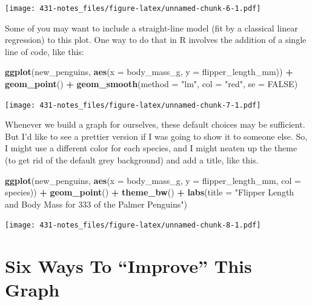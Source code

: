 \documentclass[
]{book}
\newenvironment{Shaded}{\begin{snugshade}}{\end{snugshade}}
\newcommand{\DataTypeTok}[1]{\textcolor[rgb]{0.13,0.29,0.53}{#1}}
\newcommand{\KeywordTok}[1]{\textcolor[rgb]{0.13,0.29,0.53}{\textbf{#1}}}
\newcommand{\NormalTok}[1]{#1}
\newcommand{\OperatorTok}[1]{\textcolor[rgb]{0.81,0.36,0.00}{\textbf{#1}}}
\newcommand{\OtherTok}[1]{\textcolor[rgb]{0.56,0.35,0.01}{#1}}
\newcommand{\StringTok}[1]{\textcolor[rgb]{0.31,0.60,0.02}{#1}}
\begin{document}
\texttt{[image: 431-notes\_files/figure-latex/unnamed-chunk-6-1.pdf]}

Some of you may want to include a straight-line model (fit by a classical linear regression) to this plot. One way to do that in R involves the addition of a single line of code, like this:

\begin{Shaded}
\begin{Highlighting}[]
\KeywordTok{ggplot}\NormalTok{(new_penguins, }\KeywordTok{aes}\NormalTok{(}\DataTypeTok{x =}\NormalTok{ body_mass_g, }\DataTypeTok{y =}\NormalTok{ flipper_length_mm)) }\OperatorTok{+}
\StringTok{    }\KeywordTok{geom_point}\NormalTok{() }\OperatorTok{+}
\StringTok{    }\KeywordTok{geom_smooth}\NormalTok{(}\DataTypeTok{method =} \StringTok{"lm"}\NormalTok{, }\DataTypeTok{col =} \StringTok{"red"}\NormalTok{, }\DataTypeTok{se =} \OtherTok{FALSE}\NormalTok{)}
\end{Highlighting}
\end{Shaded}

\texttt{[image: 431-notes\_files/figure-latex/unnamed-chunk-7-1.pdf]}

Whenever we build a graph for ourselves, these default choices may be sufficient. But I'd like to see a prettier version if I was going to show it to someone else. So, I might use a different color for each species, and I might neaten up the theme (to get rid of the default grey background) and add a title, like this.

\begin{Shaded}
\begin{Highlighting}[]
\KeywordTok{ggplot}\NormalTok{(new_penguins, }\KeywordTok{aes}\NormalTok{(}\DataTypeTok{x =}\NormalTok{ body_mass_g, }\DataTypeTok{y =}\NormalTok{ flipper_length_mm, }\DataTypeTok{col =}\NormalTok{ species)) }\OperatorTok{+}
\StringTok{    }\KeywordTok{geom_point}\NormalTok{() }\OperatorTok{+}\StringTok{ }
\StringTok{    }\KeywordTok{theme_bw}\NormalTok{() }\OperatorTok{+}\StringTok{ }
\StringTok{    }\KeywordTok{labs}\NormalTok{(}\DataTypeTok{title =} \StringTok{"Flipper Length and Body Mass for 333 of the Palmer Penguins"}\NormalTok{)}
\end{Highlighting}
\end{Shaded}

\texttt{[image: 431-notes\_files/figure-latex/unnamed-chunk-8-1.pdf]}

\hypertarget{six-ways-to-improve-this-graph}{%
\section{Six Ways To ``Improve'' This Graph}\label{six-ways-to-improve-this-graph}}
\end{document}
